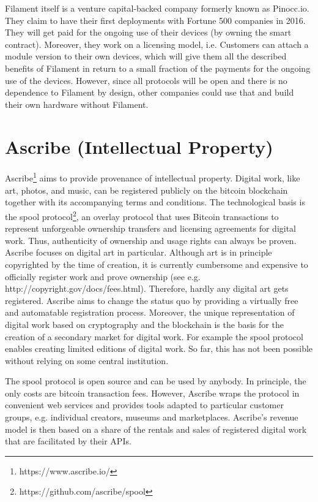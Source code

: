 Filament itself is a venture capital-backed company formerly known as Pinocc.io. 
They claim to have their first deployments with Fortune 500 companies in 2016. 
They will get paid for the ongoing use of their devices (by owning the smart contract). 
Moreover, they work on a licensing model, i.e. Customers can attach a module version 
to their own devices, which will give them all the described benefits of Filament 
in return to a small fraction of the payments for the ongoing use of the devices. 
However, since all protocols will be open and there is no dependence to Filament 
by design, other companies could use that and build their own hardware without 
Filament.

\section{Ascribe (Intellectual Property)}
\label{sec:ecoascribe}

Ascribe\footnote{https://www.ascribe.io/} aims to provide provenance of intellectual property. Digital work, 
like art, photos, and music, can be registered publicly on the bitcoin blockchain 
together with its accompanying terms and conditions. The technological basis is 
the spool protocol\footnote{https://github.com/ascribe/spool}, an overlay protocol that uses 
Bitcoin transactions to represent unforgeable ownership transfers and licensing 
agreements for digital work. Thus, authenticity of ownership and usage rights can 
always be proven. Ascribe focuses on digital art in particular. Although art is 
in principle copyrighted by the time of creation, it is currently cumbersome and 
expensive to officially register work and prove ownership (see e.g. http://copyright.gov/docs/fees.html). 
Therefore, hardly any digital art gets registered. Ascribe aims to change the status 
quo by providing a virtually free and automatable registration process. Moreover, 
the unique representation of digital work based on cryptography and the blockchain 
is the basis for the creation of a secondary market for digital work. For example 
the spool protocol enables creating limited editions of digital work. So far, this 
has not been possible without relying on some central institution.

The spool protocol is open source and can be used by anybody. In principle, the 
only costs are bitcoin transaction fees. However, Ascribe wraps the protocol in 
convenient web services and provides tools adapted to particular customer groups, 
e.g. individual creators, museums and marketplaces. Ascribe's revenue model is 
then based on a share of the rentals and sales of registered digital work that 
are facilitated by their APIs.

